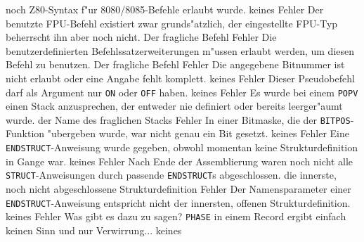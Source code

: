 \documentclass[12pt,a4paper,twoside]{report}
\newcommand{\tty}[1]{{\tt #1}}
\begin{document}
\begin{description}
{                noch Z80-Syntax f"ur 8080/8085-Befehle erlaubt
                wurde.}
               {keines}
               {Fehler}
               {Der benutzte FPU-Befehl existiert zwar
                grunds"atzlich, der eingestellte FPU-Typ
                beherrscht ihn aber noch nicht.}
               {Der fragliche Befehl}
               {Fehler}
               {Die benutzerdefinierten Befehlssatzerweiterungen
                m"ussen erlaubt werden, um diesen Befehl zu benutzen.}
               {Der fragliche Befehl}
               {Fehler}
               {Die angegebene Bitnummer ist nicht erlaubt
	        oder eine Angabe fehlt komplett.}
               {keines}
               {Fehler}
               {Dieser Pseudobefehl darf als Argument nur \tty{ON}
                oder \tty{OFF} haben.}
               {keines}
               {Fehler}
               {Es wurde bei einem \tty{POPV}
                einen Stack anzusprechen, der entweder nie definiert oder
                bereits leerger"aumt wurde.}
               {der Name des fraglichen Stacks}
	       {Fehler}
               {In einer Bitmaske, die der \tty{BITPOS}-
                Funktion "ubergeben wurde, war nicht genau ein Bit
                gesetzt.}
               {keines}
               {Fehler}
               {Eine \tty{ENDSTRUCT}-Anweisung wurde gegeben, obwohl
                momentan keine Strukturdefinition in Gange war.}
               {keines}
               {Fehler}
               {Nach Ende der Assemblierung waren noch nicht alle
                \tty{STRUCT}-Anweisungen durch passende \tty{ENDSTRUCT}s
                abgeschlossen.}
               {die innerste, noch nicht abgeschlossene
                Strukturdefinition}
               {Fehler}
               {Der Namensparameter einer \tty{ENDSTRUCT}-Anweisung
                entspricht nicht der innersten, offenen
                Strukturdefinition.}
               {keines}
               {Fehler}
               {Was gibt es dazu zu sagen?  \tty{PHASE} in einem Record
                ergibt einfach keinen Sinn und nur Verwirrung...}
               {keines}
\errentry{1554}{ung"ultige \tty{STRUCT}-Direktive}

\end{description}
\end{document}
